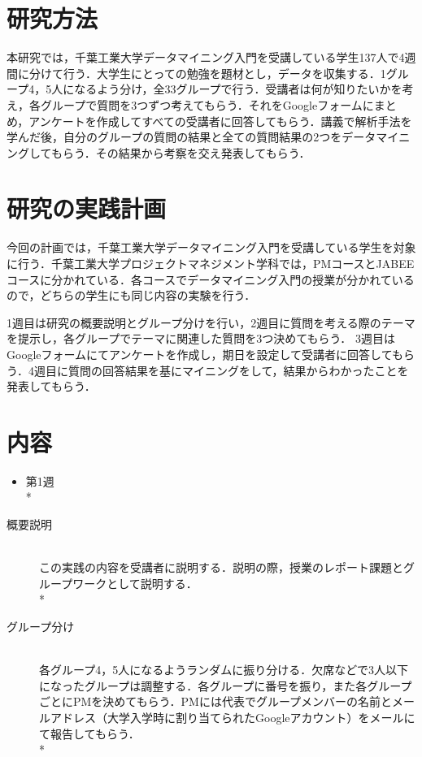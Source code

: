 \section{研究方法}
本研究では，千葉工業大学データマイニング入門を受講している学生137人で4週間に分けて行う．大学生にとっての勉強を題材とし，データを収集する．1グループ4，5人になるよう分け，全33グループで行う．受講者は何が知りたいかを考え，各グループで質問を3つずつ考えてもらう．それをGoogleフォームにまとめ，アンケートを作成してすべての受講者に回答してもらう．講義で解析手法を学んだ後，自分のグループの質問の結果と全ての質問結果の2つをデータマイニングしてもらう．その結果から考察を交え発表してもらう\cite{b}．


\section{研究の実践計画}
今回の計画では，千葉工業大学データマイニング入門を受講している学生を対象に行う．千葉工業大学プロジェクトマネジメント学科では，PMコースとJABEEコースに分かれている．各コースでデータマイニング入門の授業が分かれているので，どちらの学生にも同じ内容の実験を行う．

1週目は研究の概要説明とグループ分けを行い，2週目に質問を考える際のテーマを提示し，各グループでテーマに関連した質問を3つ決めてもらう．
3週目はGoogleフォームにてアンケートを作成し，期日を設定して受講者に回答してもらう．4週目に質問の回答結果を基にマイニングをして，結果からわかったことを発表してもらう．

\newpage

\section{内容}

\begin{itemize}
 \item 第1週 \vspace{0.1in} \\*
\end{itemize}

\begin{description}
 \item[概要説明]\mbox{}\\ 
	    この実践の内容を受講者に説明する．説明の際，授業のレポート課題とグループワークとして説明する．\vspace{0.1in} \\*
	    
	    
 \item[グループ分け]\mbox{}\\
	    各グループ4，5人になるようランダムに振り分ける．欠席などで3人以下になったグループは調整する．各グループに番号を振り，また各グループごとにPMを決めてもらう．PMには代表でグループメンバーの名前とメールアドレス（大学入学時に割り当てられたGoogleアカウント）をメールにて報告してもらう．\vspace{0.1in} \\*
\end{description}

